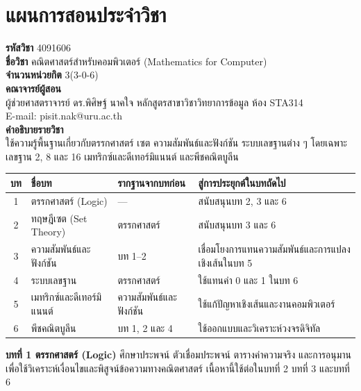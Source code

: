 \chapter*{แผนการสอนประจำวิชา}
\vspace{0.3cm}
\noindent
\textbf{รหัสวิชา} \hspace{1cm}4091606 \\
\textbf{ชื่อวิชา} \hspace{1cm}คณิตศาสตร์สำหรับคอมพิวเตอร์ (Mathematics for Computer)\\
\textbf{จำนวนหน่วยกิต} \hspace{0.5cm}3(3-0-6)\\
\textbf{คณาจารย์ผู้สอน} \\
\indent ผู้ช่วยศาสตราจารย์ ดร.พิศิษฐ์ นาคใจ \quad หลักสูตรสาขาวิชาวิทยาการข้อมูล \quad ห้อง STA314 \\
\indent E-mail: pisit.nak@uru.ac.th \\[0.5em]
\textbf{คำอธิบายรายวิชา} \\
\indent
ใช้ความรู้พื้นฐานเกี่ยวกับตรรกศาสตร์ เซต ความสัมพันธ์และฟังก์ชัน ระบบเลขฐานต่าง ๆ โดยเฉพาะเลขฐาน 2, 8 และ 16 เมทริกซ์และดีเทอร์มิแนนต์ และพีชคณิตบูลีน

\begin{center}
\small
\begin{tabular}{|c|>{\raggedright\arraybackslash}p{2.8cm}|>{\raggedright\arraybackslash}p{4.5cm}|>{\raggedright\arraybackslash}p{4.5cm}|}
\hline
\textbf{บท} & \textbf{ชื่อบท} & \textbf{รากฐานจากบทก่อน} & \textbf{สู่การประยุกต์ในบทถัดไป} \\ \hline
1 & ตรรกศาสตร์ (Logic) & --- & สนับสนุนบท 2, 3 และ 6 \\ \hline
2 & ทฤษฎีเซต (Set Theory) & ตรรกศาสตร์ & สนับสนุนบท 3 และ 6 \\ \hline
3 & ความสัมพันธ์และฟังก์ชัน & บท 1--2 & เชื่อมโยงการแทนความสัมพันธ์และการแปลงเชิงเส้นในบท 5 \\ \hline
4 & ระบบเลขฐาน & ตรรกศาสตร์ & ใช้แทนค่า 0 และ 1 ในบท 6 \\ \hline
5 & เมทริกซ์และดีเทอร์มิแนนต์ & ความสัมพันธ์และฟังก์ชัน & ใช้แก้ปัญหาเชิงเส้นและงานคอมพิวเตอร์ \\ \hline
6 & พีชคณิตบูลีน & บท 1, 2 และ 4 & ใช้ออกแบบและวิเคราะห์วงจรดิจิทัล \\ \hline
\end{tabular}
\end{center}

\textbf{บทที่ 1 ตรรกศาสตร์ (Logic)} ศึกษาประพจน์ ตัวเชื่อมประพจน์ ตารางค่าความจริง และการอนุมาน เพื่อใช้วิเคราะห์เงื่อนไขและพิสูจน์ข้อความทางคณิตศาสตร์ เนื้อหานี้ใช้ต่อในบทที่ 2 บทที่ 3 และบทที่ 6


